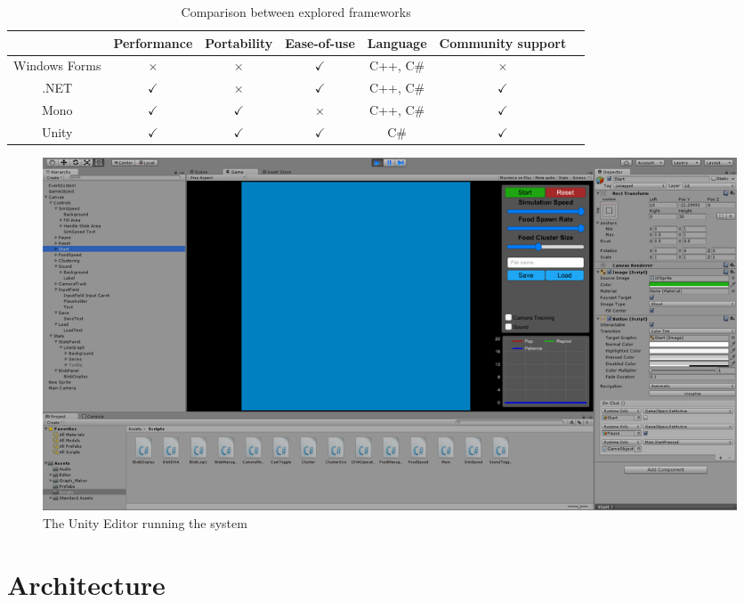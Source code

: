 \begin{table}[!th]
	\centering
	\begin{tabular}{|c|c|c|c|c|c|c|}
		\hline
						& Performance & Portability & Ease-of-use & Language & Community support \\ \hline
		Windows Forms   & $\times$      & $\times$      & $\checkmark$  & C++, C\# & $\times$     \\ \hline
		.NET            & $\checkmark$  & $\times$      & $\checkmark$  & C++, C\# & $\checkmark$ \\ \hline
		Mono            & $\checkmark$  & $\checkmark$  & $\times$      & C++, C\# & $\checkmark$ \\ \hline
		Unity           & $\checkmark$  & $\checkmark$  & $\checkmark$  & C\#      & $\checkmark$ \\ \hline
	\end{tabular}
	\caption{\label{table:frameworkscomp}Comparison between explored frameworks}
\end{table}

\begin{figure}[!th]
	\centering
	\includegraphics[scale=0.35]{images/unityfinal}
	\caption{\label{fig:unityfinal}The Unity Editor running the system}
\end{figure}

\section{Architecture}

